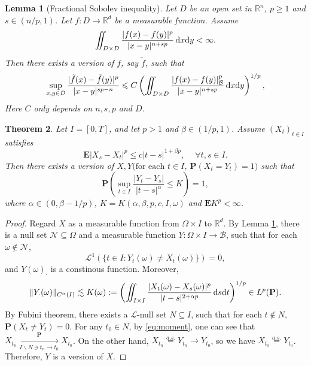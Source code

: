 \documentclass[twoside, 12pt]{book}
\numberwithin{equation}{chapter}
\newtheorem{theorem}{Theorem}[section]
\newtheorem{lemma}[theorem]{Lemma}
\def\cB{{\mathcal B}}
\def\cN{{\mathcal N}}
\def\mR{{\mathbb R}}
\def\bE{{\mathbf E}}
\def\bP{{\mathbf P}}
\def\sL{{\mathscr L}}
\def\l{\left}
\def\r{\right}
\def\geq{\geqslant}
\def\leq{\leqslant}
\def\d{\text{\rm{d}}}
\begin{document}
	\begin{lemma}[Fractional Sobolev inequality]\label{Le:GRRI}
		Let $D$ be an open set in $\mR^n$, $p\geq 1$ and $s\in (n/p,1)$. Let $f:D\to \mR^d$ be a measurable function. Assume \begin{align*}
			\iint_{D\times D}\frac{|f(x)-f(y)|^p}{|x-y|^{n+sp}}\, \d x \d y<\infty. 
		\end{align*}
		Then there exists a version of $f$, say $\tilde f$, such that 
		\begin{equation}
			\sup_{x,y\in D}\frac{|\tilde f(x)-\tilde f(y)|^p}{|x-y|^{sp-n}}\leq C \l(\iint_{D\times D} \frac{|f(x)-f(y)|_{\cB}^p}{|x-y|^{n+sp}}\, \d x\d y\r)^{1/p}, 
		\end{equation}
		Here $C$ only depends on $n,s,p$ and $D$. 
	\end{lemma}
	
	\begin{theorem}\label{Thm:K2}
		Let $I=[0,T]$, and let $p>1$ and $\beta\in(1/p,1)$. Assume $(X_t)_{t\in I}$ satisfies  
		\begin{equation}\label{eq:moment}
			\bE |X_s-X_t|^p \leq c |t-s|^{1+\beta p}, \quad ~\forall t,s\in I. 
		\end{equation}
		Then there exists a version of $X, Y (\mbox{for each }t\in I$, $\bP(X_t=Y_t)=1)$ such that  
		\[
		\bP\l(\sup_{t\in I}\frac{|Y_t-Y_s|}{|t-s|^\alpha}\leq K\r) =1, 
		\]
		where $\alpha\in (0,\beta-1/p)$, $K=K(\alpha,\beta,p,c,I,\omega)$ and $\bE K^p<\infty$. 
	\end{theorem}
	\begin{proof}
		Regard $X$ as a measurable function from  $\Omega\times I$ to $\mR^d$. By Lemma \ref{Le:GRRI}, there is a null set $\cN\subseteq \Omega$ and a measurable function $Y: \Omega\times I \to \cB$, such that for each $\omega\notin \cN$, 
		\[
		\sL^1\l(\{ t\in I: Y_t(\omega)\neq X_t(\omega)\}\r)=0, 
		\]
		and $Y(\omega)_{\cdot}$ is a constinous function. Moreover, 
		\[
		\|Y_{\cdot}(\omega)\|_{C^{\alpha}(I)}\lesssim  K(\omega):= \l(\iint_{I\times I} \frac{|X_t(\omega)-X_s(\omega)|^p}{|t-s|^{2+\alpha p}}\, \d s \d t\r)^{1/p}\in L^p(\bP).
		\]
		By Fubini theorem, there exists a $\sL$-null set $N\subseteq I$, such that for each $t\notin N$, $\bP(X_t\neq Y_t)=0$. For any $t_0\in N$, by \eqref{eq:moment}, one can see that $X_{t_n} \xrightarrow[I\backslash N \ni t_n \to t_0]{\bP} X_{t_0}$. On the other hand, $X_{t_n}\overset{a.s.}{=}Y_{t_n}\to Y_{t_0}$, so we have $X_{t_0}\overset{a.s.}{=}Y_{t_0}$. Therefore, $Y$ is a version of $X$.  
	\end{proof}
	
\end{document}
